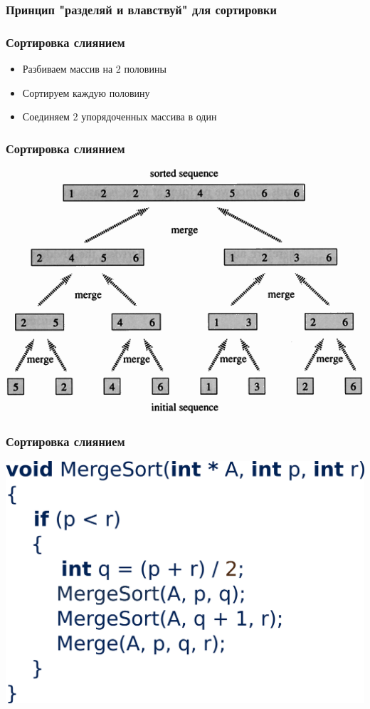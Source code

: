 \documentclass[12pt,pdf,hyperref={unicode}]{beamer}
\begin{document}
\begin{frame}[fragile]
\frametitle{Принцип "разделяй и влавствуй" для сортировки} 
\frametitle{Сортировка слиянием} 
\begin{itemize}
\item Разбиваем массив на 2 половины \\
\item Сортируем каждую половину \\
\item Соединяем 2 упорядоченных массива в один \\
\end{itemize}
\end{frame}

\begin{frame}[fragile]
\frametitle{Сортировка слиянием} 
\begin{center}
\includegraphics[width=0.9\linewidth]{images/mergeSort.png}
\end{center}
\end{frame}


\begin{frame}[fragile]
\frametitle{Сортировка слиянием} 
\begin{center}
\includegraphics[width=0.9\linewidth]{images/mergeSort_pseudo.png}
\end{center}
\end{frame}
\end{document}
